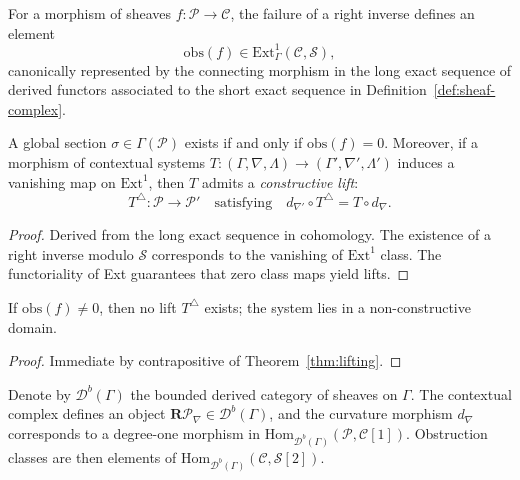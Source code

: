 \begin{definition}\label{def:ext}
For a morphism of sheaves $f:\mathcal P\to\mathcal C$, the failure of a right inverse defines an element
\[
\mathrm{obs}(f)\in \mathrm{Ext}^1_\Gamma(\mathcal C,\mathcal S),
\]
canonically represented by the connecting morphism in the long exact sequence of derived functors associated to the short exact sequence in Definition~\ref{def:sheaf-complex}.
\end{definition}

\begin{theorem}\label{thm:lifting}
A global section $\sigma\in\Gamma(\mathcal P)$ exists if and only if 
$\mathrm{obs}(f)=0$. Moreover, if a morphism of contextual systems 
$T:(\Gamma,\nabla,\Lambda)\to(\Gamma',\nabla',\Lambda')$
induces a vanishing map on $\mathrm{Ext}^1$, then $T$ admits a \emph{constructive lift}:
\[
T^\triangle:\mathcal P\longrightarrow \mathcal P'
\quad\text{satisfying}\quad
d_{\nabla'}\circ T^\triangle = T\circ d_\nabla.
\]
\end{theorem}

\begin{proof}
Derived from the long exact sequence in cohomology. The existence of a right inverse modulo $\mathcal S$ corresponds to the vanishing of $\mathrm{Ext}^1$ class. The functoriality of Ext guarantees that zero class maps yield lifts. \relax
\end{proof}

\begin{corollary}\label{cor:nonconstructive}
If $\mathrm{obs}(f)\neq0$, then no lift $T^\triangle$ exists; the system lies in a non-constructive domain.
\end{corollary}

\begin{proof}
Immediate by contrapositive of Theorem~\ref{thm:lifting}. \relax
\end{proof}


\begin{definition}\label{def:derived}
Denote by $\mathcal D^b(\Gamma)$ the bounded derived category of sheaves on $\Gamma$. 
The contextual complex defines an object 
$\mathbf R\mathcal P_\nabla\in\mathcal D^b(\Gamma)$, 
and the curvature morphism $d_\nabla$ corresponds to a degree-one morphism in $\mathrm{Hom}_{\mathcal D^b(\Gamma)}(\mathcal P,\mathcal C[1])$. 
Obstruction classes are then elements of 
$\mathrm{Hom}_{\mathcal D^b(\Gamma)}(\mathcal C,\mathcal S[2])$.
\end{definition}

